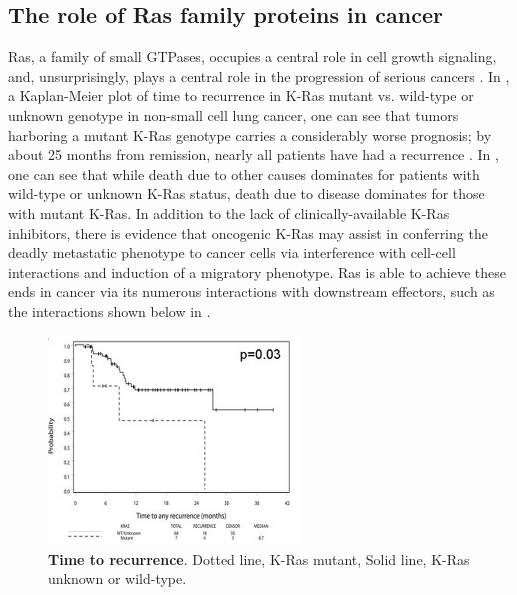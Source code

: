 \documentclass[12pt]{article}
\begin{document}
\subsection*{The role of Ras family proteins in cancer}	
  Ras, a family of small GTPases, occupies a central role in cell growth signaling, and, unsurprisingly, plays a central role in the progression of serious cancers \cite{mak2014}. In , a Kaplan-Meier plot of time to recurrence in K-Ras mutant vs. wild-type or unknown genotype in non-small cell lung cancer, one can see that tumors harboring a mutant K-Ras genotype carries a considerably worse prognosis; by about 25 months from remission, nearly all patients have had a recurrence \cite{mak2014}. In , one can see that while death due to other causes dominates for patients with wild-type or unknown K-Ras status, death due to disease dominates for those with mutant K-Ras. In addition to the lack of clinically-available K-Ras inhibitors, there is evidence that oncogenic K-Ras may assist in conferring the deadly metastatic phenotype to cancer cells via interference with cell-cell interactions and induction of a migratory phenotype\cite{pyla}. Ras is able to achieve these ends in cancer via its numerous interactions with downstream effectors, such as the interactions shown below in . 
  \begin{figure}[H]
  \centering
  \includegraphics[width=0.6\textwidth]{kaplanmeier.png}
  \caption{\textbf{Time to recurrence}. Dotted line, K-Ras mutant, Solid line, K-Ras unknown or wild-type.\cite{mak2014}}
  \label{kaplanrecurrence}
  \end{figure}
  
\end{document}
